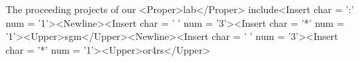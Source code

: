 The proceeding projects of our <Proper>lab</Proper> include<Insert char = ':' num = '1'><Newline><Insert char = ' ' num = '3'><Insert char = '*' num = '1'><Upper>sgm</Upper><Newline><Insert char = ' ' num = '3'><Insert char = '*' num = '1'><Upper>or4rs</Upper>
